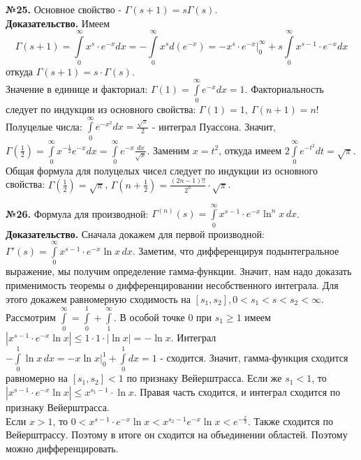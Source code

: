 \textbf{№25.} Основное свойство - $\boxed{\Gamma(s+1)=s\Gamma(s)}$.\\
\textbf{Доказательство.} 
Имеем $$\Gamma(s+1)=\int\limits_{0}^{\infty}x^{s}\cdot e^{-x}dx=
-\int\limits_{0}^{\infty}x^sd(e^{-x})=-x^{s}\cdot e^{-x}\Big|^\infty_0+
s \int\limits_{0}^{\infty}x^{s-1}\cdot e^{-x}dx$$ откуда $\Gamma(s+1)=
s\cdot \Gamma(s)$.\\
Значение в единице и факториал: 
$\Gamma(1)=\int\limits_{0}^{\infty}e^{-x}dx=1$. Факториальность следует 
по индукции из основного свойства:  $\Gamma(1)=1,~\Gamma(n+1)=n!$ \\
Полуцелые числа:
$\int\limits_{0}^{\infty}e^{-x^2}dx=\frac{\sqrt{\pi} }{2}$ - интеграл 
Пуассона. Значит, $\Gamma(\frac{1}{2})=\int\limits_{0}^{\infty}x^{-\frac{1}{2}}
e^{-x}dx=\int\limits_{0}^{\infty}e^{-x}\frac{dx}{\sqrt{x}}$. Заменим 
$x=t^2$, откуда  имеем $2 \int\limits_{0}^{\infty}e^{-t^2}dt=\sqrt{\pi}$.
Общая формула для полуцелых чисел следует по индукции из основного свойства:
$\Gamma\left( \frac{1}{2} \right)=\sqrt{\pi}$, $\Gamma\left( 
n+\frac{1}{2}\right)=\frac{(2n-1)!!}{2^n}\cdot \sqrt{\pi}$.

\textbf{№26.} Формула для производной:
$\Gamma^{(n)}(s)=\int\limits_{0}^{\infty}x^{s-1}\cdot e^{-x}\ln^n x\,dx$.\\
\textbf{Доказательство.} Сначала докажем для первой производной:
$\Gamma'(s)=\int\limits_{0}^{\infty}x^{s-1}\cdot e^{-x}\ln x\,dx$. 
Заметим, что дифференцируя подынтегральное выражение, мы получим определение
гамма-функции. Значит, нам надо доказать применимость теоремы о 
дифференцировании несобственного интеграла. Для этого докажем 
равномерную сходимость на $[s_1,s_2],0<s_1<s<s_2<\infty$. 
Рассмотрим
$\int\limits_{0}^{\infty} = \int\limits_{0}^{1} + \int\limits_{1}^{\infty}$.
В особой точке 0 при $s_1\geqslant1$ имеем
$|x^{s-1}\cdot e^{-x}\ln x|\leqslant 1\cdot 1\cdot |\ln x|=-\ln x$. 
Интеграл $-\int\limits_{0}^{1}\ln x\,dx=-x\ln x\big|^1_0+
\int\limits_{0}^{1}dx=1$ - сходится. Значит, гамма-функция сходится равномерно
на $[s_1,s_2]<1$ по признаку Вейерштрасса. Если же $s_1<1$, то
$|x^{s-1}\cdot e^{-x}\ln x|\leqslant x^{s_1-1}\cdot\ln x$. 
Правая часть сходится, и интеграл сходится по признаку Вейерштрасса.\\
Если $x>1$, то  $0<x^{s-1}\cdot e^{-x}\ln x<x^{s_2-1}e^{-x}\ln x
<e^{-\frac{x}{3}}$. Также сходится по Вейерштрассу. Поэтому в итоге он 
сходится на объединении областей. Поэтому можно дифференцировать. 

